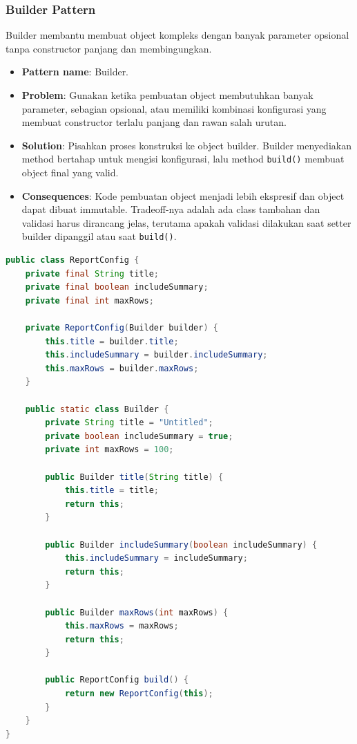 \subsubsection{Builder Pattern}

\begin{jawab}
Builder membantu membuat object kompleks dengan banyak parameter opsional tanpa constructor panjang dan membingungkan.
\end{jawab}

\begin{itemize}
    \item \textbf{Pattern name}: Builder.
    \item \textbf{Problem}: Gunakan ketika pembuatan object membutuhkan banyak parameter, sebagian opsional, atau memiliki kombinasi konfigurasi yang membuat constructor terlalu panjang dan rawan salah urutan.
    \item \textbf{Solution}: Pisahkan proses konstruksi ke object builder. Builder menyediakan method bertahap untuk mengisi konfigurasi, lalu method \texttt{build()} membuat object final yang valid.
    \item \textbf{Consequences}: Kode pembuatan object menjadi lebih ekspresif dan object dapat dibuat immutable. Tradeoff-nya adalah ada class tambahan dan validasi harus dirancang jelas, terutama apakah validasi dilakukan saat setter builder dipanggil atau saat \texttt{build()}.
\end{itemize}

\begin{lstlisting}[language=Java, caption={Builder Pattern}, label={lst:builder-pattern}]
public class ReportConfig {
    private final String title;
    private final boolean includeSummary;
    private final int maxRows;

    private ReportConfig(Builder builder) {
        this.title = builder.title;
        this.includeSummary = builder.includeSummary;
        this.maxRows = builder.maxRows;
    }

    public static class Builder {
        private String title = "Untitled";
        private boolean includeSummary = true;
        private int maxRows = 100;

        public Builder title(String title) {
            this.title = title;
            return this;
        }

        public Builder includeSummary(boolean includeSummary) {
            this.includeSummary = includeSummary;
            return this;
        }

        public Builder maxRows(int maxRows) {
            this.maxRows = maxRows;
            return this;
        }

        public ReportConfig build() {
            return new ReportConfig(this);
        }
    }
}
\end{lstlisting}

